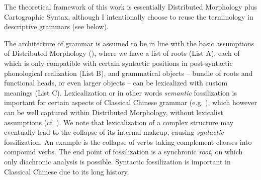 \documentclass[UTF8, a4paper, oneside, scheme=plain, 12pt]{ctexrep}
\begin{document}
{\small
The theoretical framework of this work is essentially Distributed Morphology plus Cartographic Syntax,
although I intentionally choose to reuse the terminology in descriptive grammars (see below).

The architecture of grammar is assumed to be in line with the basic assumptions of Distributed Morphology (),
where we have a list of roots (List A),
each of which is only compatible with certain syntactic positions in post-syntactic phonological realization (List B),
and grammatical objects -- bundle of roots and functional heads, or even larger objects -- can be lexicalized with custom meanings (List C).
Lexicalization or in other words \emph{semantic} fossilization is important for certain aspects of Classical Chinese grammar (e.g. ),
which however can be well captured within Distributed Morphology,
without lexicalist assumptions (cf. \citealt{bruening2018lexicalist}).
We note that lexicalization of a complex structure may eventually lead to the collapse of its internal makeup, causing \emph{syntactic} fossilization.
An example is the collapse of verbs taking complement clauses into compound verbs.
The end point of fossilization is a synchronic \emph{root},
on which only diachronic analysis is possible.
Syntactic fossilization is important in Classical Chinese due to its long history.

}
\end{document}
